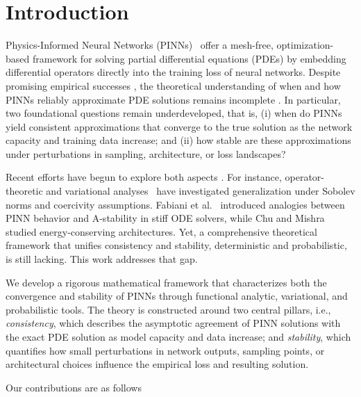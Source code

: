 \documentclass[11pt, a4paper]{article}
\begin{document}
\section{Introduction}

Physics-Informed Neural Networks (PINNs)~\cite{raissi2019physics} offer a mesh-free, optimization-based framework for solving partial differential equations (PDEs) by embedding differential operators directly into the training loss of neural networks. Despite promising empirical successes \cite{shin2020convergence}, the theoretical understanding of when and how PINNs reliably approximate PDE solutions remains incomplete \cite{psaros2023uncertainty, lu2021priori, wang2021understanding}. In particular, two foundational questions remain underdeveloped, that is, (i) when do PINNs yield consistent approximations that converge to the true solution as the network capacity and training data increase; and (ii) how stable are these approximations under perturbations in sampling, architecture, or loss landscapes?

Recent efforts have begun to explore both aspects \cite{de2024comprehensive}. For instance, operator-theoretic and variational analyses~\cite{deryck2022generalization, mishra2022estimates, gazoulis2023operator} have investigated generalization under Sobolev norms and coercivity assumptions. Fabiani et al.~\cite{fabiani2023stability} introduced analogies between PINN behavior and A-stability in stiff ODE solvers, while Chu and Mishra~\cite{chu2023structure} studied energy-conserving architectures. Yet, a comprehensive theoretical framework that unifies consistency and stability, deterministic and probabilistic, is still lacking. This work addresses that gap.

We develop a rigorous mathematical framework that characterizes both the convergence and stability of PINNs through functional analytic, variational, and probabilistic tools. The theory is constructed around two central pillars, i.e., \emph{consistency}, which describes the asymptotic agreement of PINN solutions with the exact PDE solution as model capacity and data increase; and \emph{stability}, which quantifies how small perturbations in network outputs, sampling points, or architectural choices influence the empirical loss and resulting solution.

Our contributions are as follows
\end{document}
